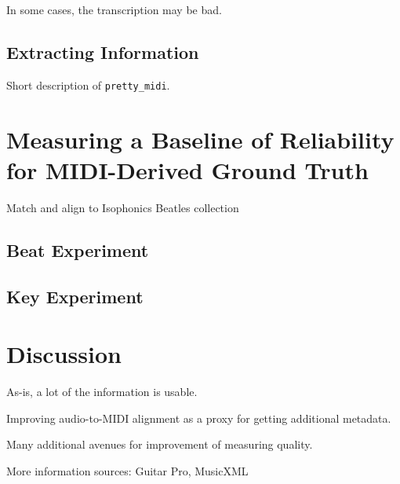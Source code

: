\documentclass{article}
\begin{document}
In some cases, the transcription may be bad.

\subsection{Extracting Information}

Short description of \texttt{pretty\_midi}.

\section{Measuring a Baseline of Reliability for MIDI-Derived Ground Truth}
\label{sec:measuring}

Match and align to Isophonics Beatles collection

\subsection{Beat Experiment}

\subsection{Key Experiment}

\section{Discussion}
\label{sec:discussion}

As-is, a lot of the information is usable.

Improving audio-to-MIDI alignment as a proxy for getting additional metadata.

Many additional avenues for improvement of measuring quality.

More information sources: Guitar Pro, MusicXML


\end{document}
